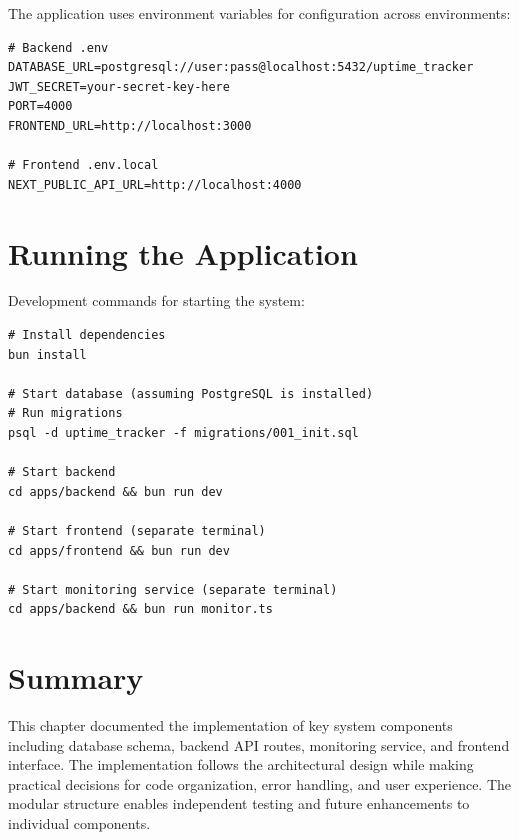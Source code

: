The application uses environment variables for configuration across environments:

\begin{verbatim}
# Backend .env
DATABASE_URL=postgresql://user:pass@localhost:5432/uptime_tracker
JWT_SECRET=your-secret-key-here
PORT=4000
FRONTEND_URL=http://localhost:3000

# Frontend .env.local
NEXT_PUBLIC_API_URL=http://localhost:4000
\end{verbatim}

\section{Running the Application}

Development commands for starting the system:

\begin{verbatim}
# Install dependencies
bun install

# Start database (assuming PostgreSQL is installed)
# Run migrations
psql -d uptime_tracker -f migrations/001_init.sql

# Start backend
cd apps/backend && bun run dev

# Start frontend (separate terminal)
cd apps/frontend && bun run dev

# Start monitoring service (separate terminal)
cd apps/backend && bun run monitor.ts
\end{verbatim}

\section{Summary}

This chapter documented the implementation of key system components including database schema, backend API routes, monitoring service, and frontend interface. The implementation follows the architectural design while making practical decisions for code organization, error handling, and user experience. The modular structure enables independent testing and future enhancements to individual components.

